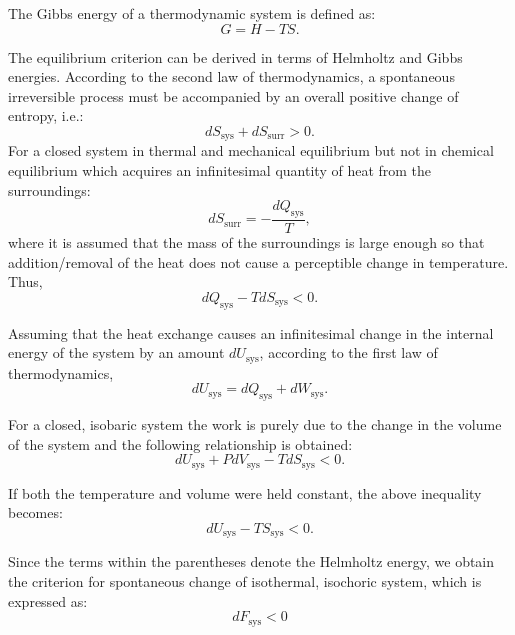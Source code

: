 		The Gibbs energy of a thermodynamic system is defined as:
		\begin{equation}
			G = H - TS.
		\end{equation}

		The equilibrium criterion can be derived in terms of Helmholtz and Gibbs energies. According to the second law of thermodynamics, a spontaneous irreversible process must be accompanied by an overall positive change of entropy, i.e.:
		\begin{equation}
			dS_\text{sys} + dS_\text{surr} > 0.
		\end{equation}
		For a closed system in thermal and mechanical equilibrium but not in chemical equilibrium which acquires an infinitesimal quantity of heat from the surroundings:
		\begin{equation}
			dS_\text{surr} = -\frac{dQ_\text{sys}}{T},
		\end{equation}
		where it is assumed that the mass of the surroundings is large enough so that addition/removal of the heat does not cause a perceptible change in temperature. Thus,
		\begin{equation}
			{dQ_\text{sys}} - T dS_\text{sys}  < 0.
		\end{equation}

		Assuming that the heat exchange causes an infinitesimal change in the internal energy of the system by an amount $dU_\text{sys}$, according to the first law of thermodynamics,
		\begin{equation}
			{dU_\text{sys}} = {dQ_\text{sys}} + {dW_\text{sys}}.
		\end{equation}

		For a closed, isobaric system the work is purely due to the change in the volume of the system and the following relationship is obtained:
		\begin{equation}
			{dU_\text{sys}} + P{dV_\text{sys}} - T{dS_\text{sys}} < 0.
		\end{equation}

		If both the temperature and volume were held constant, the above inequality becomes:
		\begin{equation}
			d{U_\text{sys} - TS_\text{sys} } < 0.
		\end{equation}

		Since the terms within the parentheses denote the Helmholtz energy, we obtain the criterion for spontaneous change of isothermal, isochoric system, which is expressed as:
		\begin{equation}
			d{F_\text{sys} } < 0
		\end{equation}

